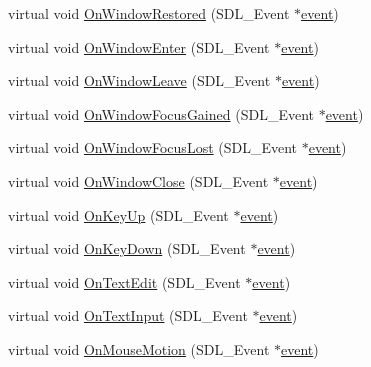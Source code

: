 \begin{DoxyCompactItemize}
\item 
virtual void \hyperlink{class_d_k_event_ab6ea3a6d3dae73b420bec6bd73722596}{On\-Window\-Restored} (S\-D\-L\-\_\-\-Event $\ast$\hyperlink{class_d_k_event_a3deebb932ed734363c4ece87971bc45f}{event})
\item 
virtual void \hyperlink{class_d_k_event_a8b1f789c712a382e321a433db4b414fb}{On\-Window\-Enter} (S\-D\-L\-\_\-\-Event $\ast$\hyperlink{class_d_k_event_a3deebb932ed734363c4ece87971bc45f}{event})
\item 
virtual void \hyperlink{class_d_k_event_a2c0564e57e4f1c152eb06b391799b556}{On\-Window\-Leave} (S\-D\-L\-\_\-\-Event $\ast$\hyperlink{class_d_k_event_a3deebb932ed734363c4ece87971bc45f}{event})
\item 
virtual void \hyperlink{class_d_k_event_a8d7c75a2f18ac2c0c0bbe5566a75aa65}{On\-Window\-Focus\-Gained} (S\-D\-L\-\_\-\-Event $\ast$\hyperlink{class_d_k_event_a3deebb932ed734363c4ece87971bc45f}{event})
\item 
virtual void \hyperlink{class_d_k_event_a3317237c711adff19aef0e6cd61e27c3}{On\-Window\-Focus\-Lost} (S\-D\-L\-\_\-\-Event $\ast$\hyperlink{class_d_k_event_a3deebb932ed734363c4ece87971bc45f}{event})
\item 
virtual void \hyperlink{class_d_k_event_a6161540936445623e8a208c01686bcc6}{On\-Window\-Close} (S\-D\-L\-\_\-\-Event $\ast$\hyperlink{class_d_k_event_a3deebb932ed734363c4ece87971bc45f}{event})
\item 
virtual void \hyperlink{class_d_k_event_a273c6b492490351fffbebfd047a55ff2}{On\-Key\-Up} (S\-D\-L\-\_\-\-Event $\ast$\hyperlink{class_d_k_event_a3deebb932ed734363c4ece87971bc45f}{event})
\item 
virtual void \hyperlink{class_d_k_event_aadf17b23137ac90ce434e3d14b18b2e0}{On\-Key\-Down} (S\-D\-L\-\_\-\-Event $\ast$\hyperlink{class_d_k_event_a3deebb932ed734363c4ece87971bc45f}{event})
\item 
virtual void \hyperlink{class_d_k_event_a11336bef2a93f1ed60df421966fa678f}{On\-Text\-Edit} (S\-D\-L\-\_\-\-Event $\ast$\hyperlink{class_d_k_event_a3deebb932ed734363c4ece87971bc45f}{event})
\item 
virtual void \hyperlink{class_d_k_event_a73e4c44234be141ac9d68b4f73fe564e}{On\-Text\-Input} (S\-D\-L\-\_\-\-Event $\ast$\hyperlink{class_d_k_event_a3deebb932ed734363c4ece87971bc45f}{event})
\item 
virtual void \hyperlink{class_d_k_event_a8082934ad6166b2a493851c633a78708}{On\-Mouse\-Motion} (S\-D\-L\-\_\-\-Event $\ast$\hyperlink{class_d_k_event_a3deebb932ed734363c4ece87971bc45f}{event})

\end{DoxyCompactItemize}
